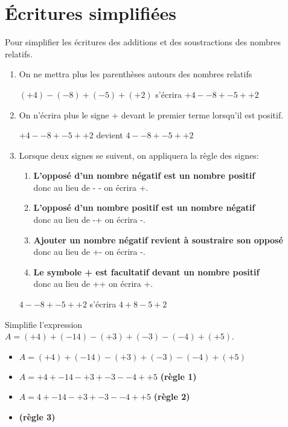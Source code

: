 \section{Écritures simplifiées}

\begin{methode*1}
  Pour simplifier les écritures des additions et des soustractions des nombres relatifs.
  \begin{enumerate}
    \item On ne mettra plus les parenthèses autours des nombres relatifs
      \begin{center}
        $(+4)-(-8)+(-5)+(+2)$ s'écrira $+4--8+-5++2$
      \end{center}
    \item On n'écrira plus le signe + devant le premier terme lorsqu'il est positif.
      \begin{center}
        $+4--8+-5++2$ devient $4--8+-5++2$
      \end{center}
    \item Lorsque deux signes se suivent, on appliquera la règle des signes:
      \begin{enumerate}
        \item \textbf{L'opposé d'un nombre négatif est un nombre positif} \\ donc au lieu de - - on écrira +.
        \item \textbf{L'opposé d'un nombre positif est un nombre négatif} \\ donc au lieu de -+ on écrira -.
        \item \textbf{Ajouter un nombre négatif revient à soustraire son opposé} \\ donc au lieu de +- on écrira -.
        \item \textbf{Le symbole + est facultatif devant un nombre positif} \\ donc au lieu de ++ on écrira +.
      \end{enumerate}
      \begin{center}
        $4--8+-5++2$ s'écrira $4+8-5+2$
      \end{center}
  \end{enumerate}
  \begin{center}
  \end{center}
  \exercice
  Simplifie l'expression $A=(+4)+(-14)-(+3)+(-3)-(-4)+(+5)$.
  \correction
  \begin{itemize}
    \item[] $A=(+4)+(-14)-(+3)+(-3)-(-4)+(+5)$
    \item[] $A=+4+-14-+3+-3--4++5$  \textbf{(règle 1)}
    \item[] $A=4+-14-+3+-3--4++5$  \textbf{(règle 2)}
    \item[]  \textbf{(règle 3)}
  \end{itemize}
\end{methode*1}

